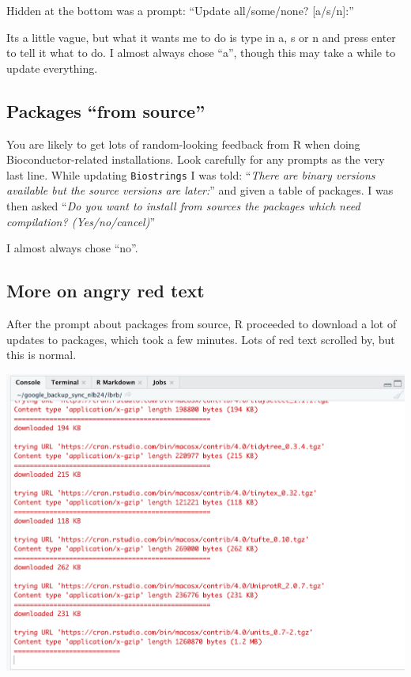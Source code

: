 \documentclass[
]{book}
\begin{document}
Hidden at the bottom was a prompt: ``Update all/some/none? {[}a/s/n{]}:''

Its a little vague, but what it wants me to do is type in a, s or n and press enter to tell it what to do. I almost always chose ``a'', though this may take a while to update everything.

\hypertarget{packages-from-source}{%
\subsection{Packages ``from source''}\label{packages-from-source}}

You are likely to get lots of random-looking feedback from R when doing Bioconductor-related installations. Look carefully for any prompts as the very last line. While updating \texttt{Biostrings} I was told: ``\emph{There are binary versions available but the source versions are later:}'' and given a table of packages. I was then asked ``\emph{Do you want to install from sources the packages which need compilation? (Yes/no/cancel)}''

I almost always chose ``no''.

\hypertarget{more-on-angry-red-text}{%
\subsection{More on angry red text}\label{more-on-angry-red-text}}

After the prompt about packages from source, R proceeded to download a lot of updates to packages, which took a few minutes. Lots of red text scrolled by, but this is normal.

\includegraphics[width=20.25in]{images/angry_red_text_download_biostrings}
\end{document}
